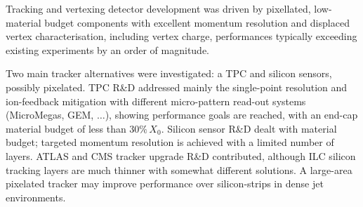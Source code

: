 \documentclass[%
 reprint,
 amsmath,amssymb,
 aps,
]{revtex4-1}
\begin{document}



Tracking and vertexing detector development
  was driven by pixellated, low-material budget
 components with excellent momentum resolution and displaced
 vertex characterisation, including vertex charge, performances
typically exceeding existing experiments  by an order of magnitude.


Two main tracker alternatives  were investigated:
a TPC and silicon sensors, possibly pixelated. TPC R\&D 
addressed mainly the single-point
resolution and ion-feedback mitigation with different micro-pattern
read-out systems (MicroMegas, GEM, $\ldots$), showing
performance goals are reached, with an end-cap material budget of 
less than $30 \%\,X_0$. Silicon sensor R\&D dealt with material budget; 
targeted momentum resolution is achieved with a limited number of layers.
ATLAS and CMS tracker upgrade R\&D contributed,
although ILC silicon tracking layers
are much thinner with somewhat different solutions.
A large-area pixelated tracker may improve
performance over silicon-strips in dense jet environments.  
\end{document}
